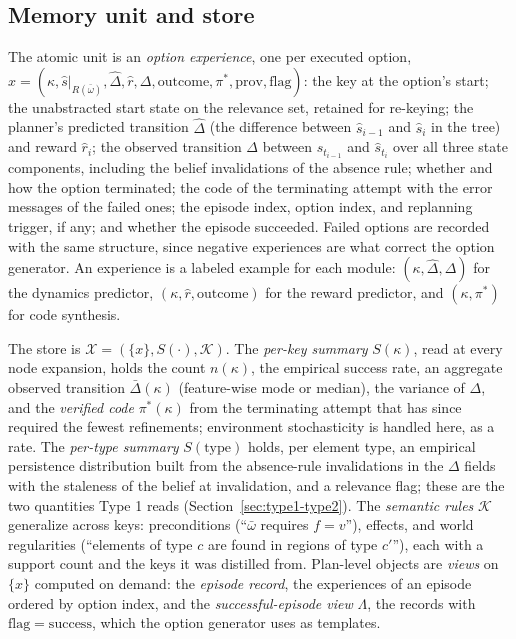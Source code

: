 \documentclass[10pt]{article}
\newcommand{\calK}{\mathcal{K}}
\newcommand{\calX}{\mathcal{X}}
\newcommand{\Rel}{R}
\newcommand{\shat}{\hat{s}}
\newcommand{\prov}{\mathrm{prov}}
\newcommand{\type}{\mathrm{type}}
\begin{document}
\subsection{Memory unit and store}
\label{sec:type2-unit}

The atomic unit is an \emph{option experience}, one per executed option, $x=(\kappa,\allowbreak\shat|_{\Rel(\bar\omega)},\allowbreak\hat\Delta,\allowbreak\hat r,\allowbreak\Delta,\allowbreak\mathrm{outcome},\allowbreak\pi^{\ast},\allowbreak\prov,\allowbreak\mathrm{flag})$: the key at the option's start; the unabstracted start state on the relevance set, retained for re-keying; the planner's predicted transition $\hat\Delta$ (the difference between $\shat_{i-1}$ and $\shat_i$ in the tree) and reward $\hat r_i$; the observed transition $\Delta$ between $\shat_{t_{i-1}}$ and $\shat_{t_i}$ over all three state components, including the belief invalidations of the absence rule; whether and how the option terminated; the code of the terminating attempt with the error messages of the failed ones; the episode index, option index, and replanning trigger, if any; and whether the episode succeeded. Failed options are recorded with the same structure, since negative experiences are what correct the option generator. An experience is a labeled example for each module: $(\kappa,\hat\Delta,\Delta)$ for the dynamics predictor, $(\kappa,\hat r,\mathrm{outcome})$ for the reward predictor, and $(\kappa,\pi^\ast)$ for code synthesis.

The store is $\calX=(\{x\},S(\cdot),\calK)$. The \emph{per-key summary} $S(\kappa)$, read at every node expansion, holds the count $n(\kappa)$, the empirical success rate, an aggregate observed transition $\bar\Delta(\kappa)$ (feature-wise mode or median), the variance of $\Delta$, and the \emph{verified code} $\pi^\ast(\kappa)$ from the terminating attempt that has since required the fewest refinements; environment stochasticity is handled here, as a rate. The \emph{per-type summary} $S(\type)$ holds, per element type, an empirical persistence distribution built from the absence-rule invalidations in the $\Delta$ fields with the staleness of the belief at invalidation, and a relevance flag; these are the two quantities Type 1 reads (Section~\ref{sec:type1-type2}). The \emph{semantic rules} $\calK$ generalize across keys: preconditions (``$\bar\omega$ requires $f=v$''), effects, and world regularities (``elements of type $c$ are found in regions of type $c'$''), each with a support count and the keys it was distilled from. Plan-level objects are \emph{views} on $\{x\}$ computed on demand: the \emph{episode record}, the experiences of an episode ordered by option index, and the \emph{successful-episode view} $\Lambda$, the records with $\mathrm{flag}=\mathrm{success}$, which the option generator uses as templates.
\end{document}
